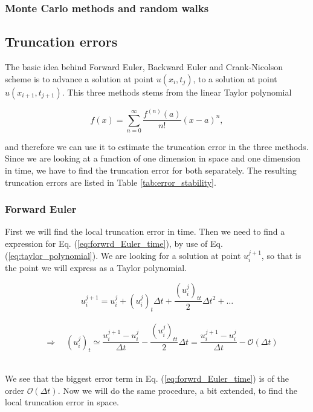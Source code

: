 \documentclass[12pt]{article}
\begin{document}
\begin{flushleft}
\subsubsection{Monte Carlo methods and random walks}


\subsection{Truncation errors}
The basic idea behind Forward Euler, Backward Euler and Crank-Nicolson scheme is to advance a solution at point $u(x_i,t_j)$, to a solution at point $u(x_{i+1},t_{j+1})$. This three methods stems from the linear Taylor polynomial

\vspace{5mm}
\begin{equation}\label{eq:taylor_polynomial}
f(x) = \sum\limits_{n=0}^{\infty}\frac{f^{(n)}(a)}{n!}(x-a)^n,
\end{equation}
\vspace{5mm} 

and therefore we can use it to estimate the truncation error in the three methods. Since we are looking at a function of one dimension in space and one dimension in time, we have to find the truncation error for both separately. The resulting truncation errors are listed in Table \ref{tab:error_stability}.
\subsubsection{Forward Euler}
First we will find the local truncation error in time. Then we need to find a expression for Eq. (\ref{eq:forwrd_Euler_time}), by use of Eq. (\ref{eq:taylor_polynomial}). We are looking for a solution at point $u_i^{j+1}$, so that is the point we will express as a Taylor polynomial.

\vspace{5mm}
$$u_i^{j+1} = u_i^j + (u_i^j)_t\Delta t + \frac{(u_i^j)_{tt}}{2}\Delta t^2 + \dots$$\\
\vspace{5mm} 
$$\quad\Rightarrow\quad (u_i^j)_t \simeq \frac{u_i^{j+1}-u_i^j}{\Delta t} - \frac{(u_i^j)_{tt}}{2}\Delta t = \frac{u_i^{j+1}-u_i^j}{\Delta t} - \mathcal{O}(\Delta t)$$\\
\vspace{5mm}

We see that the biggest error term in Eq. (\ref{eq:forwrd_Euler_time}) is of the order $\mathcal{O}(\Delta t)$. Now we will do the same procedure, a bit extended, to find the local truncation error in space.


\end{flushleft}
\end{document}
